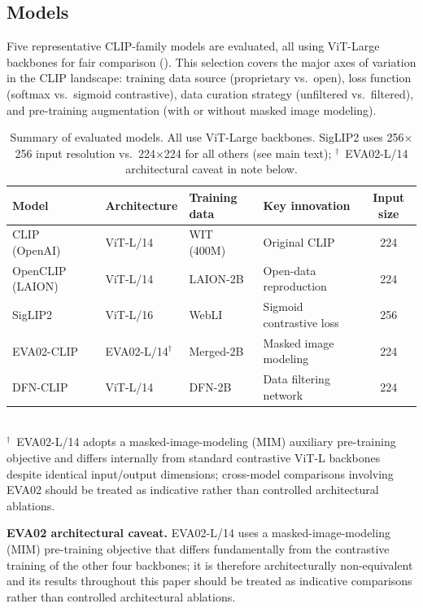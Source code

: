 \documentclass[electronics,article,submit,pdftex,moreauthors]{Definitions/mdpi}
\begin{document}
\subsection{Models}
\label{sec:models}

Five representative CLIP-family models are evaluated, all using ViT-Large backbones for fair comparison ().
This selection covers the major axes of variation in the CLIP landscape: training data source (proprietary vs.\ open), loss function (softmax vs.\ sigmoid contrastive), data curation strategy (unfiltered vs.\ filtered), and pre-training augmentation (with or without masked image modeling).

\begin{table}[H]
\caption{Summary of evaluated models. All use ViT-Large backbones. SigLIP2 uses 256$\times$256 input resolution vs.\ 224$\times$224 for all others (see main text); $^{\dagger}$~EVA02-L/14 architectural caveat in note below.}
\label{tab:models}
\centering
\small
\setlength{\tabcolsep}{4pt}
\begin{tabular}{llllc}
\toprule
\textbf{Model} & \textbf{Architecture} & \textbf{Training data} & \textbf{Key innovation} & \textbf{Input size} \\
\midrule
CLIP (OpenAI)~\cite{radford2021learning} & ViT-L/14 & WIT (400M) & Original CLIP & 224 \\
OpenCLIP (LAION)~\cite{cherti2023reproducible} & ViT-L/14 & LAION-2B & Open-data reproduction & 224 \\
SigLIP2~\cite{tschannen2025siglip2} & ViT-L/16 & WebLI & Sigmoid contrastive loss & 256 \\
EVA02-CLIP~\cite{sun2023eva02} & EVA02-L/14$^{\dagger}$ & Merged-2B & Masked image modeling & 224 \\
DFN-CLIP~\cite{fang2023data} & ViT-L/14 & DFN-2B & Data filtering network & 224 \\
\bottomrule
\end{tabular}
\\[3pt]
{\footnotesize $^{\dagger}$~EVA02-L/14 adopts a masked-image-modeling (MIM) auxiliary pre-training objective and differs internally from standard contrastive ViT-L backbones despite identical input/output dimensions; cross-model comparisons involving EVA02 should be treated as indicative rather than controlled architectural ablations.}
\end{table}

\textbf{EVA02 architectural caveat.} EVA02-L/14 uses a masked-image-modeling (MIM) pre-training objective that differs fundamentally from the contrastive training of the other four backbones; it is therefore architecturally non-equivalent and its results throughout this paper should be treated as indicative comparisons rather than controlled architectural ablations.
\end{document}
